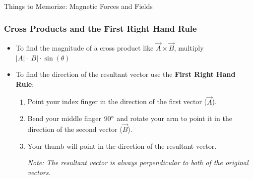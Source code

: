 \documentclass[letterpaper, 12pt]{article}
\begin{document}
	


\begin{center}Things to Memorize: Magnetic Forces and Fields
\end{center}
\vspace{-.6cm}
\subsubsection*{Cross Products and the First Right Hand Rule}
\begin{itemize}
	\item To find the magnitude of a cross product like $ \vec{A} \times \vec{B}$, multiply $|A| \cdot |B| \cdot \sin(\theta) $ 
	\item To find the direction of the resultant vector use the \textbf{First Right Hand Rule}:
	\begin{enumerate}
		\item Point your index finger in the direction of the first vector ($\vec{A}$).
		\item Bend your middle finger $90 \degree $ and rotate your arm to point it in the direction of the second vector ($\vec{B}$).
		\item Your thumb will point in the direction of the resultant vector.
		
		\textit{Note: The resultant vector is always perpendicular to both of the original vectors.}
	\end{enumerate}
\end{itemize}
\vspace{-.5cm}
\end{document}
